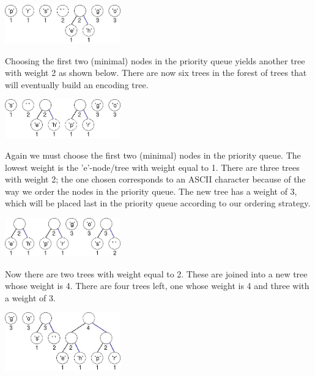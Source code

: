 \documentclass[11pt]{article}
\begin{document}
\begin{center}
  \includegraphics[width=5cm]{figures/ngopher2}
\end{center}

Choosing the first two (minimal) nodes in the priority queue yields
another tree with weight 2 as shown below.  There are now six trees in
the forest of trees that will eventually build an encoding tree.

\begin{center}
  \includegraphics[width=5cm]{figures/ngopher3}
\end{center}

Again we must choose the first two (minimal) nodes in the priority
queue.  The lowest weight is the 'e'-node/tree with weight equal to 1.
There are three trees with weight 2; the one chosen corresponds to an
ASCII character because of the way we order the nodes in the priority
queue.  The new tree has a weight of 3, which will be placed last in
the priority queue according to our ordering strategy.

\begin{center}
  \includegraphics[width=5cm]{figures/ngopher4}
\end{center}

Now there are two trees with weight equal to 2.  These are joined into
a new tree whose weight is 4.  There are four trees left, one whose
weight is 4 and three with a weight of 3.

\begin{center}
  \includegraphics[width=5cm]{figures/ngopher5}
\end{center}
\end{document}
